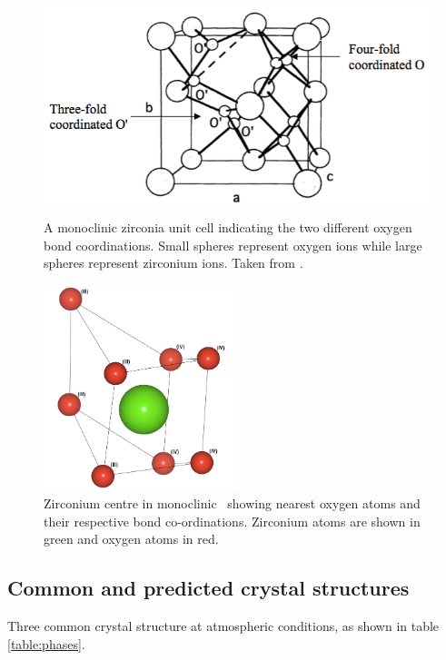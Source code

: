 \begin{figure}[htp] %
\centering
\includegraphics[height=6.2cm]{images/coordination.png}
\caption{A monoclinic zirconia unit cell indicating the two different oxygen bond coordinations. Small spheres represent oxygen ions while large spheres represent zirconium ions. Taken from \cite{Xia2010}.
\label{figure:coordination}}
\end{figure}

\begin{figure}[htp] %
\centering
\includegraphics[height=6cm]{images/zr_centre_mono.png}
\caption{Zirconium centre in monoclinic \zirconia\ showing nearest oxygen atoms and their respective bond co-ordinations. Zirconium atoms are shown in green and oxygen atoms in red.}
\label{figure:monoschottky}
\end{figure}

\subsection{Common and predicted crystal structures}

Three common crystal structure at atmospheric conditions, as shown in table \ref{table:phases}.

